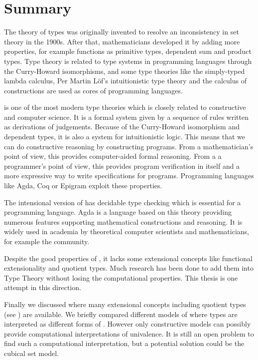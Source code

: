 \section{Summary}


The theory of types was originally invented to resolve an inconsistency in set theory in the 1900s. After that, mathematicians developed it by adding more properties, for example functions as primitive types, dependent sum and product types. Type theory is related to type systems in programming languages through the Curry-Howard isomorphisms, and some type theories like the simply-typed lambda calculus, Per Martin L\"{o}f's intuitionistic type theory and the calculus of constructions are used as cores of programming languages.

\mltt is one of the most modern type theories which is closely related to constructive \maths and computer science. It is a formal system given by a sequence of rules written as derivations of judgements. Because of the Curry-Howard isomorphism and dependent types, it is also a system for intuitionistic logic. This means that we can do constructive reasoning by constructing programs. From a mathematician's point of view, this provides computer-aided formal reasoning. From a a programmer's point of view, this provides program verification in itself and a more expressive way to write specifications for programs. Programming languages like Agda, Coq or Epigram exploit these properties.

The intensional version of \mltt has decidable type checking which is essential for a programming language. Agda is a language based on this theory providing numerous features supporting mathematical constructions and reasoning. It is widely used in academia by theoretical computer scientists and mathematicians, for example the \hott community. 

Despite the good properties of \itt, it lacks some extensional concepts like functional extensionality and quotient types. Much research has been done to add them into Type Theory without losing the computational properties. This thesis is one attempt in this direction.

Finally we discussed \hott where many extensional concepts including quotient types (see ) are available. 
We briefly compared different models of \hott where types are interpreted as different forms of \wog. However only constructive models can possibly provide computational interpretations of univalence. It is still an open problem to find such a computational interpretation, but a potential solution could be the cubical set model.







